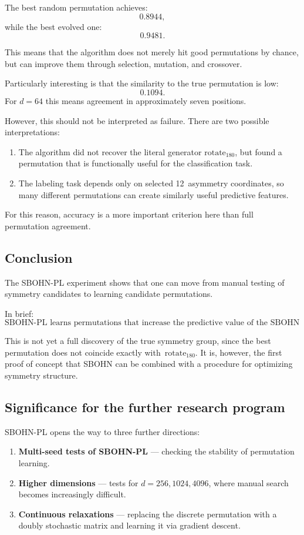 \documentclass[11pt,a4paper]{report}
\begin{document}
The best random permutation achieves:
\[
0.8944,
\]
while the best evolved one:
\[
0.9481.
\]

This means that the algorithm does not merely hit good permutations by chance, but can improve them through selection, mutation, and crossover.

Particularly interesting is that the similarity to the true permutation is low:
\[
0.1094.
\]
For $d=64$ this means agreement in approximately seven positions.

However, this should not be interpreted as failure. There are two possible interpretations:

\begin{enumerate}
\item The algorithm did not recover the literal generator $\mathrm{rotate}_{180}$, but found a permutation that is functionally useful for the classification task.
\item The labeling task depends only on selected 12~asymmetry coordinates, so many different permutations can create similarly useful predictive features.
\end{enumerate}

For this reason, accuracy is a more important criterion here than full permutation agreement.

\subsection{Conclusion}

The SBOHN-PL experiment shows that one can move from manual testing of symmetry candidates to learning candidate permutations.

In brief:
\[
\boxed{
\text{SBOHN-PL learns permutations that increase the predictive value of the SBOHN representation.}
}
\]

This is not yet a full discovery of the true symmetry group, since the best permutation does not coincide exactly with~$\mathrm{rotate}_{180}$. It is, however, the first proof of concept that SBOHN can be combined with a procedure for optimizing symmetry structure.

\subsection{Significance for the further research program}

SBOHN-PL opens the way to three further directions:

\begin{enumerate}
\item \textbf{Multi-seed tests of SBOHN-PL} --- checking the stability of permutation learning.
\item \textbf{Higher dimensions} --- tests for $d=256,1024,4096$, where manual search becomes increasingly difficult.
\item \textbf{Continuous relaxations} --- replacing the discrete permutation with a doubly stochastic matrix and learning it via gradient descent.
\end{enumerate}
\end{document}

